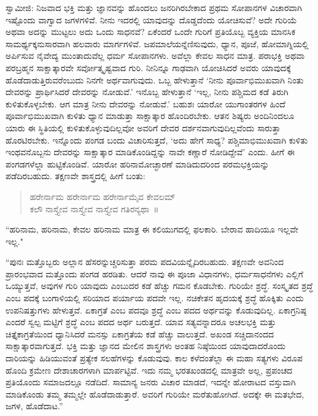 ಸ್ವಾಮೀಜಿ: ನಿಜವಾದ ಭಕ್ತಿ ಮತ್ತು ಜ್ಞಾನವನ್ನು ಹೊಂದಲು ಜನರಿಗಿರಬೇಕಾದ ಪ್ರಥಮ ಸೋಪಾನಗಳ ವಿಚಾರವಾಗಿ ಇಷ್ಟೊಂದು ವಾಗ್ವಾದ ಜಗಳಗಳಿವೆ. ನೀನು ಇದರಲ್ಲಿ ಯಾವುದನ್ನು ದೊಡ್ಡದೆಂದು ಯೋಚಿಸುವೆ? ಅದೇ ಗುರಿಯೆ ಅಥವಾ ಅದನ್ನು ಮುಟ್ಟಲು ಅದು ಒಂದು ಸಾಧನವೆ? ಏಕೆಂದರೆ ಒಂದೇ ಗುರಿಗೆ ಪ್ರತಿಯೊಬ್ಬ ವ್ಯಕ್ತಿಯ ಮಾನಸಿಕ ಸಾಮರ್ಥ್ಯಕ್ಕನುಸಾರವಾಗಿ ಹಲವಾರು ಮಾರ್ಗಗಳಿವೆ. ಜಪಮಾಲೆಯನ್ನೆಣಿಸುವುದು, ಧ್ಯಾನ, ಪೂಜೆ, ಹೋಮಾಗ್ನಿಯಲ್ಲಿ ಅರ್ಪಿಸುವ ನೈವೇದ್ಯ ಮುಂತಾದುವೆಲ್ಲ ಧರ್ಮ ಸೋಪಾನಗಳು. ಅವೆಲ್ಲಾ ಕೇವಲ ಸಾಧನ ಮಾತ್ರ. ಪರಾಭಕ್ತಿ ಅಥವಾ ಪರಬ್ರಹ್ಮನ ಸಾಕ್ಷಾತ್ಕಾರವೇ ಸರ್ವೋತ್ಕೃಷ್ಟವಾದ ಗುರಿ. ನೀನಿನ್ನೂ ಗಾಢವಾಗಿ ಯೋಚಿಸಿದರೆ ಅವರು ಯಾವುದಕ್ಕೆ ಹೊಡೆದಾಡುತ್ತಿರುವರೆಂಬುದು ನಿನಗೇ ಅರ್ಥವಾಗುವುದು. ಒಬ್ಬ ಹೇಳುತ್ತಾನೆ ‘ನೀನು ಪೂರ್ವಾಭಿಮುಖವಾಗಿ ನಿಂತು ದೇವರನ್ನು ಪ್ರಾರ್ಥಿಸಿದರೆ ದೇವರನ್ನು ನೋಡುವೆ.’ ಇನೊಬ್ಬ ಹೇಳುತ್ತಾನೆ ‘ಇಲ್ಲ, ನೀನು ಪಶ್ಚಿಮದ ಕಡೆ ತಿರುಗಿ ಕುಳಿತುಕೊಳ್ಳಬೇಕು. ಆಗ ಮಾತ್ರ ನೀನು ದೇವರನ್ನು ನೋಡುವೆ.’ ಬಹುಶಃ ಯಾರೋ ಯುಗಾಂತರಗಳ ಹಿಂದೆ ಪೂರ್ವಾಭಿಮುಖವಾಗಿ ಕುಳಿತು ಧ್ಯಾನ ಮಾಡುತ್ತಾ ಸಾಕ್ಷಾತ್ಕಾರ ಹೊಂದಿರಬೇಕು. ಆತನ ಶಿಷ್ಯರು ಅಂದಿನಿಂದಲೂ ಯಾರು ಈ ಸ್ಥಿತಿಯಲ್ಲಿ ಕುಳಿತುಕೊಳ್ಳುವುದಿಲ್ಲವೋ ಅವರಿಗೆ ದೇವರ ದರ್ಶನವಾಗುವುದಿಲ್ಲವೆಂದು ಸಾರುತ್ತಾ ಹೊರಟಿರಬೇಕು. ಇನ್ನೊಂದು ಪಂಗಡ ಬಂದು ವಿಚಾರಿಸುತ್ತದೆ, ‘ಅದು ಹೇಗೆ ಸಾಧ್ಯ? ಪಶ್ಚಿಮಾಭಿಮುಖವಾಗಿ ಕುಳಿತು ಇಂಥವನೊಬ್ಬನು ದೇವರನ್ನು ಸಾಕ್ಷಾತ್ಕಾರ ಮಾಡಿಕೊಂಡಿದ್ದನ್ನು ನಾವೇ ಕಣ್ಣಾರೆ ನೋಡಿದ್ದೇವೆ’ ಎಂದು. ಹೀಗೆ ಈ ಪಂಗಡಗಳೆಲ್ಲಾ ಹುಟ್ಟಿಕೊಂಡಿವೆ. ಯಾರೋ ಹರಿನಾಮೋಚ್ಛಾರಣೆ ಮಾಡಿದುದರಿಂದ ಪರಮಭಕ್ತಿಯನ್ನು ಪಡೆದಿರಬಹುದು. ತಕ್ಷಣವೇ ಶಾಸ್ತ್ರದಲ್ಲಿ ಹೀಗೆ ಬಂತು:

\begin{verse}
ಹರೇರ್ನಾಮ ಹರೇರ್ನಾಮ ಹರೇರ್ನಾಮೈವ ಕೇವಲಮ್\\ಕಲೌ ನಾಸ್ತ್ಯೇವ ನಾಸ್ತ್ಯೇವ ನಾಸ್ತ್ಯೇವ ಗತಿರನ್ಯಥಾ~॥
\end{verse}

“ಹರಿನಾಮ, ಹರಿನಾಮ, ಕೇವಲ ಹರಿನಾಮ ಮಾತ್ರ ಈ ಕಲಿಯುಗದಲ್ಲಿ ಫಲಕಾರಿ. ಬೇರಾವ ಹಾದಿಯೂ ಇಲ್ಲವೇ ಇಲ್ಲ."

“ಪುನಃ ಮತ್ತೊಬ್ಬರು ಅಲ್ಲಾನ ಹೆಸರನ್ನುಚ್ಚರಿಸುತ್ತಾ ಪರಮ ಪದವಿಯನ್ನೈದಿರಬಹುದು. ತಕ್ಷಣವೇ ಅವನಿಂದ ಪ್ರಾರಂಭವಾದ ಮತ್ತೊಂದು ಪಂಗಡ ಹರಡಿತು. ಆದರೆ ನಾವು ಈ ಪೂಜಾ ವಿಧಾನಗಳು, ಧರ್ಮಸಾಧನೆಗಳು ಎಲ್ಲಿಗೆ ಒಯ್ಯುತ್ತವೆ, ಅವುಗಳ ಗುರಿ ಯಾವುದು ಎಂಬುದರ ಕಡೆ ಹೆಚ್ಚು ಗಮನ ಕೊಡಬೇಕು. ಗುರಿಯೇ ಶ್ರದ್ಧೆ. ಸಂಸ್ಕೃತದ ಶ್ರದ್ಧೆ ಎಂಬ ಪದಕ್ಕೆ ಬಂಗಾಳಿಯಲ್ಲಿ ಸರಿಯಾದ ಪರ್ಯಾಯ ಪದವೇ ಇಲ್ಲ. ನಚಿಕೇತನ ಹೃದಯಕ್ಕೆ ಶ್ರದ್ಧೆ ಹೊಕ್ಕಿತು ಎಂದು ಉಪನಿಷತ್ತುಗಳು ಹೇಳುತ್ತವೆ. ಏಕಾಗ್ರತೆ ಎಂಬ ಪದವೂ ಶ್ರದ್ಧೆ ಎಂಬ ಪದದ ಅರ್ಥವನ್ನು ಕೊಡುವುದಿಲ್ಲ. ಏಕಾಗ್ರನಿಷ್ಠ ಎಂದರೆ ಸ್ವಲ್ಪ ಮಟ್ಟಿಗೆ ಶ್ರದ್ಧೆ ಎಂಬ ಪದದ ಅರ್ಥ ಬರುತ್ತದೆ. ಯಾವ ಸತ್ಯವನ್ನಾದರೂ ಅಚಲಭಕ್ತಿ ಮತ್ತು ಚಿತ್ತೈಕಾಗ್ರತೆಯಿಂದ ಧ್ಯಾನಿಸಿದರೆ ಮನಸ್ಸು ಏಕಾಗ್ರತೆಯ ಕಡೆ ಹೆಚ್ಚು ವಾಲುತ್ತದೆ. ಅಖಂಡ ಸಚ್ಚಿದಾನಂದದ ಸಾಕ್ಷಾತ್ಕಾರವಾಗುತ್ತದೆ. ಭಕ್ತಿ ಮತ್ತು ಜ್ಞಾನದ ಮೇಲಿನ ಶಾಸ್ತ್ರಗಳು ಅಂತಹ ನಿಷ್ಠೆಯಿಂದ ಯಾವುದಾದರೊಂದು ದಾರಿಯನ್ನು ಹಿಡಿಯುವಂತೆ ಪ್ರತ್ಯೇಕ ಸಲಹೆಗಳನ್ನು ಕೊಡುವುವು. ಕಾಲ ಕಳೆದಂತೆಲ್ಲಾ ಈ ಮಹಾ ಸತ್ಯಗಳು ವಿರೂಪ ಹೊಂದಿ ಕ್ರಮೇಣ ದೇಶಾಚಾರಗಳಾಗಿ ಮಾರ್ಪಟ್ಟಿವೆ. ಇದು ನಮ್ಮ ಭರತಖಂಡದಲ್ಲಿ ಮಾತ್ರವೇ ಅಲ್ಲ, ಪ್ರಪಂಚದ ಪ್ರತಿಯೊಂದು ಸಮಾಜದಲ್ಲೂ ನಡೆದಿದೆ. ಸಾಮಾನ್ಯ ಜನರು ವಿಚಾರ ಮಾಡದೆ, ಇದನ್ನೇ ಹೋರಾಟದ ವಸ್ತುವಾಗಿ ಮಾಡಿಕೊಂಡು ತಮ್ಮ ತಮ್ಮಲ್ಲೇ ಹೊಡೆದಾಡುತ್ತಾರೆ. ಅವರಿಗೆ ಗುರಿಯೇ ಮರೆತುಹೋಗಿದೆ. ಅದಕ್ಕೇ ಈ ಮತಭೇದ, ಜಗಳ, ಹೊಡೆದಾಟ.”

